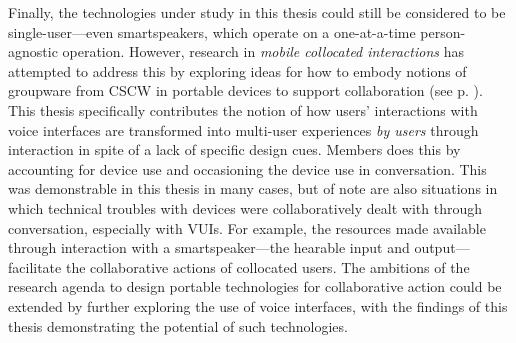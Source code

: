 \begin{corrections}
Finally, the technologies under study in this thesis could still be considered to be single-user---even smartspeakers, which operate on a one-at-a-time person-agnostic operation.
However, research in \textit{mobile collocated interactions} has attempted to address this by exploring ideas for how to embody notions of groupware from \ac{CSCW} in portable devices to support collaboration (see p. \pageref{line:singleuser}).
This thesis specifically contributes the notion of how users' interactions with voice interfaces are transformed into multi-user experiences \textit{by users} through interaction in spite of a lack of specific design cues.
Members does this by accounting for device use and occasioning the device use in conversation.
This was demonstrable in this thesis in many cases, but of note are also situations in which technical troubles with devices were collaboratively dealt with through conversation, especially with \acp{VUI}.
For example, the resources made available through interaction with a smartspeaker---the hearable input and output---facilitate the collaborative actions of collocated users.
The ambitions of the research agenda to design portable technologies for collaborative action could be extended by further exploring the use of voice interfaces, with the findings of this thesis demonstrating the potential of such technologies.
\end{corrections}






